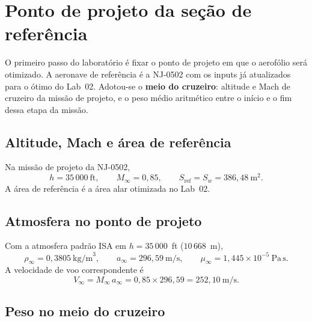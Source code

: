 
\section{Ponto de projeto da seção de referência}
\label{sec:ponto-projeto}

O primeiro passo do laboratório é fixar o ponto de projeto em que o
aerofólio será otimizado. A aeronave de referência é a NJ-0502 com os
inputs já atualizados para o ótimo do Lab~02. Adotou-se o
\textbf{meio do cruzeiro}: altitude e Mach de cruzeiro da missão de
projeto, e o peso médio aritmético entre o início e o fim dessa etapa da missão.

\subsection{Altitude, Mach e área de referência}

Na missão de projeto da NJ-0502,
\begin{equation}
h = 35\,000~\mathrm{ft},
\qquad
M_{\infty} = 0{,}85,
\qquad
S_{\mathrm{ref}} = S_w = 386{,}48~\mathrm{m}^2.
\end{equation}
A área de referência é a área alar otimizada no Lab~02.

\subsection{Atmosfera no ponto de projeto}

Com a atmosfera padrão ISA em $h = 35\,000$~ft ($10\,668$~m),
\begin{equation}
\rho_{\infty} = 0{,}3805~\mathrm{kg/m}^3,
\qquad
a_{\infty} = 296{,}59~\mathrm{m/s},
\qquad
\mu_{\infty} = 1{,}445\times 10^{-5}~\mathrm{Pa\,s}.
\end{equation}
A velocidade de voo correspondente é
\begin{equation}
V_{\infty} = M_{\infty}\,a_{\infty}
= 0{,}85\times 296{,}59
= 252{,}10~\mathrm{m/s}.
\end{equation}

\subsection{Peso no meio do cruzeiro}

